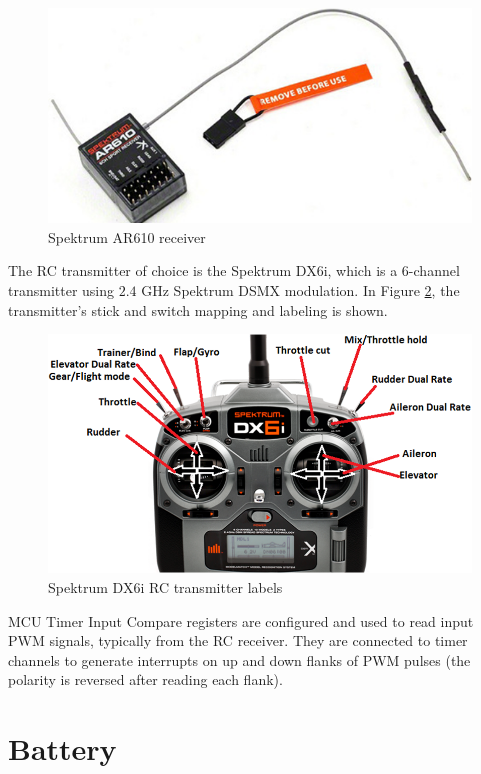 \documentclass[a4paper]{report}
\begin{document}
\begin{figure}
    \centering
    \includegraphics[scale=0.8]{images/ar610.png}
    \caption{Spektrum AR610 receiver}
    \label{fig:ar610}
\end{figure}

The RC transmitter of choice is the Spektrum DX6i, which is a 6-channel transmitter using $2.4$ GHz Spektrum DSMX modulation. In Figure \ref{fig:dx6i_map}, the transmitter's stick and switch mapping and labeling is shown.

\begin{figure}
    \centering
    \includegraphics[scale=0.6]{images/dx6i_map.png}
    \caption{Spektrum DX6i RC transmitter labels}
    \label{fig:dx6i_map}
\end{figure}

MCU Timer Input Compare registers are configured and used to read input PWM signals, typically from the RC receiver. They are connected to timer channels to generate interrupts on up and down flanks of PWM pulses (the polarity is reversed after reading each flank).

	\section{Battery}
\end{document}
